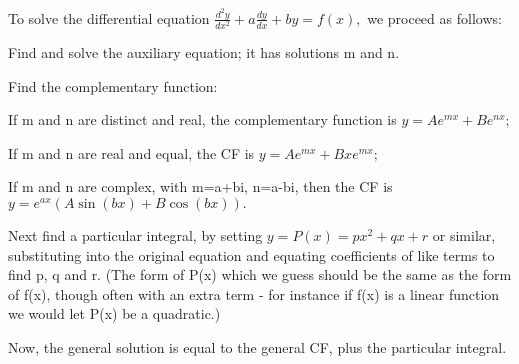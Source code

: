  To solve the  differential equation $ \frac{d^2 y}{dx^2} + a \frac{dy}{dx}
+ by = f(x), $ we proceed as follows:
\par
Find and solve the auxiliary equation; it has solutions m and n.
\par
Find the complementary function:
\par
If m and n are distinct and real, the complementary
function is $ y = Ae^{mx} + Be^{nx} ; $
\par
If m and n are real and equal, the CF is $ y = Ae^{mx} + Bxe^{mx} ; $
\par
If m and n are complex, with m=a+bi, n=a-bi, then the CF
is $ y = e^{ax} ( A \sin (bx) + B \cos (bx) ) . $
\par
Next find a particular integral, by setting $y=P(x)=px^{2}+qx+r$  or similar, 
substituting into the original equation and equating coefficients of 
like terms to find p, q and r. (The form of P(x) which we guess should 
be the same as the form of f(x), though often with an extra term -
for instance if f(x) is a linear function we would let P(x) be a quadratic.)
\par
Now, the general solution is equal to the general CF, plus the 
particular integral.
